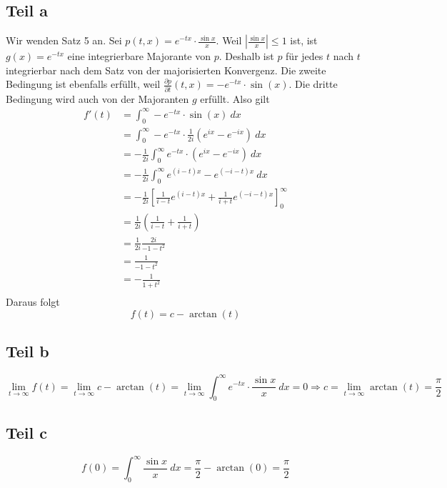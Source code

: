 \documentclass[10pt,a4paper]{article}
\begin{document}
\subsection{Teil a}
Wir wenden Satz 5 an.
Sei $p(t, x) = e^{-tx} \cdot \frac{\sin x}{x}$.
Weil $|\frac{\sin x}{x}| \le 1$ ist, ist $g(x) = e^{-tx}$ eine integrierbare Majorante von $p$.
Deshalb ist $p$ für jedes $t$ nach $t$ integrierbar nach dem Satz von der majorisierten Konvergenz.
Die zweite Bedingung ist ebenfalls erfüllt, weil $\frac{\partial p}{\partial t}(t, x) = -e^{-tx} \cdot \sin(x)$.
Die dritte Bedingung wird auch von der Majoranten $g$ erfüllt.
Also gilt
\begin{align*}
  f'(t) & = \int_{0}^{\infty} -e^{-tx} \cdot \sin(x)\ dx\\
  & = \int_{0}^{\infty} -e^{-tx} \cdot \frac{1}{2i}(e^{ix} - e^{-ix})\ dx\\
  & = -\frac{1}{2i} \int_{0}^{\infty} e^{-tx} \cdot(e^{ix} - e^{-ix})\ dx\\
  & = -\frac{1}{2i} \int_{0}^{\infty} e^{(i - t)x} - e^{(-i - t)x}\ dx\\
  & = -\frac{1}{2i} \left[ \frac{1}{i - t} e^{(i - t)x} + \frac{1}{i + t} e^{(-i - t)x} \right]_{0}^{\infty}\\
  & = \frac{1}{2i} \left( \frac{1}{i - t} + \frac{1}{i + t} \right)\\
  & = \frac{1}{2i} \frac{2i}{-1 - t^{2}} \\
  & = \frac{1}{-1 - t^{2}} \\
  & = -\frac{1}{1 + t^{2}} \\
\end{align*}
Daraus folgt
\begin{equation}
  f(t) = c - \arctan(t)
\end{equation}

\subsection{Teil b}
\begin{equation}
  \lim_{t \rightarrow \infty} f(t) = \lim_{t \rightarrow \infty} c - \arctan(t) = \lim_{t \rightarrow \infty} \int_{0}^{\infty} e^{-tx} \cdot \frac{\sin x}{x}\ dx = 0 \Rightarrow c = \lim_{t \rightarrow \infty} \arctan(t) = \frac{
\pi}{2}  
\end{equation}

\subsection{Teil c}
\begin{equation}
  f(0) = \int_{0}^{\infty} \frac{\sin x}{x}\ dx = \frac{\pi}{2} - \arctan(0) = \frac{\pi}{2}
\end{equation}
\end{document}
